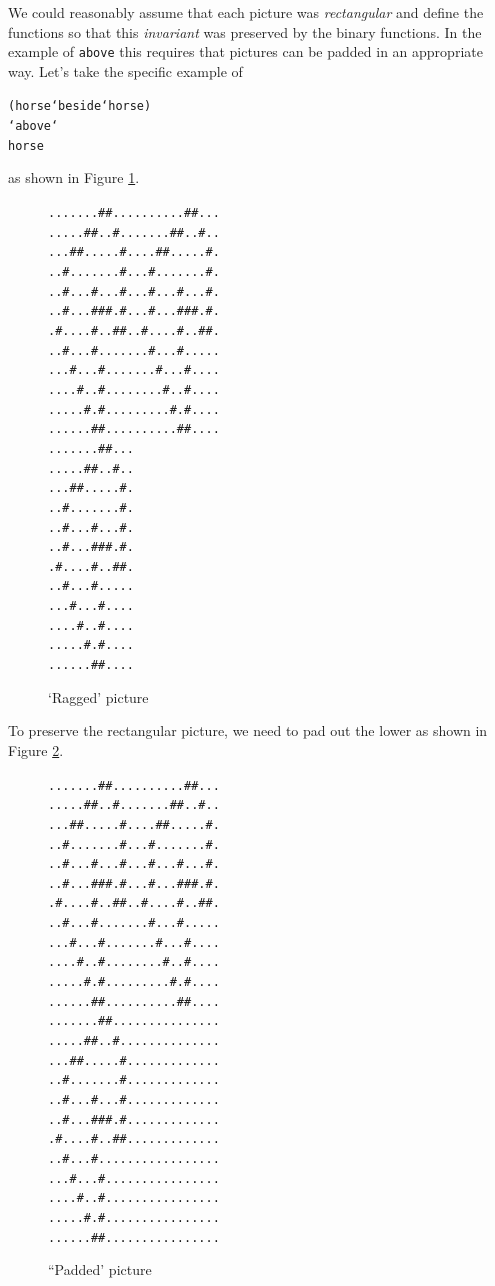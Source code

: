 We could reasonably assume that each picture was \emph{rectangular} and define the functions so that this \emph{invariant} was preserved by the binary functions. In the example of \texttt{above} this requires that pictures can be padded in an appropriate way. Let's take the specific example of 
\begin{alltt}
(horse `beside` horse)
       `above`
horse
\end{alltt}
as shown in Figure \ref{lshapedhorses}.
\begin{figure}[t]
\begin{center}
\begin{alltt}
.......##..........##...
.....##..#.......##..#..
...##.....#....##.....#.
..#.......#...#.......#.
..#...#...#...#...#...#.
..#...###.#...#...###.#.
.#....#..##..#....#..##.
..#...#.......#...#.....
...#...#.......#...#....
....#..#........#..#....
.....#.#.........#.#....
......##..........##....
.......##...
.....##..#..
...##.....#.
..#.......#.
..#...#...#.
..#...###.#.
.#....#..##.
..#...#.....
...#...#....
....#..#....
.....#.#....
......##....
\end{alltt}
\end{center}
\caption{`Ragged' picture}
\label{lshapedhorses}
\end{figure}
To preserve the rectangular picture, we need to pad out the lower as shown in Figure \ref{paddedhorses}.
\begin{figure}[t]
\begin{center}
\begin{alltt}
.......##..........##...
.....##..#.......##..#..
...##.....#....##.....#.
..#.......#...#.......#.
..#...#...#...#...#...#.
..#...###.#...#...###.#.
.#....#..##..#....#..##.
..#...#.......#...#.....
...#...#.......#...#....
....#..#........#..#....
.....#.#.........#.#....
......##..........##....
.......##...............
.....##..#..............
...##.....#.............
..#.......#.............
..#...#...#.............
..#...###.#.............
.#....#..##.............
..#...#.................
...#...#................
....#..#................
.....#.#................
......##................
\end{alltt}
\end{center}
\caption{``Padded' picture}
\label{paddedhorses}
\end{figure}

